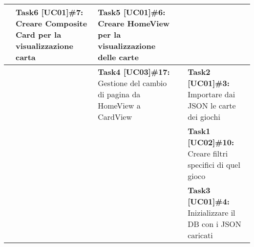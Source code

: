 \documentclass{article}
\begin{document}
\begin{itemize}
\begin{tabular}{ | p{2.4cm} | p{1.4cm} | p{2.7cm} | p{3.4cm} | p{3cm} | }
            & \textbf{Task6 [UC01]\#7:} Creare Composite Card per la visualizzazione carta
            & \textbf{Task5 [UC01]\#6:} Creare HomeView per la visualizzazione delle carte \\
            \hline
            & & \textbf{Task4 [UC03]\#17:} Gestione del cambio di pagina da HomeView a CardView
            & & \textbf{Task2 [UC01]\#3:} Importare dai JSON le carte dei giochi \\
            \hline
            & & & & \textbf{Task1 [UC02]\#10:} Creare filtri specifici di quel gioco  \\
            \hline
            & & & & \textbf{Task3 [UC01]\#4:} Inizializzare il DB con i JSON caricati \\
            \hline
        \end{tabular}
    \end{itemize}
\end{document}

